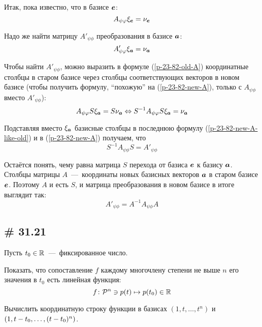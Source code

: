 \documentclass[a4paper,12pt]{article}
\begin{document}
\begin{solution}
    Итак, пока известно, что в базисе $\boldsymbol e$:
    \begin{equation}\label{p-23-82-old-A}
      A_{\psi \varphi} \xi_{\boldsymbol e} = \nu_{\boldsymbol e}
    \end{equation}
    
    Надо же найти матрицу $A'_{\psi\phi}$ преобразования в базисе $\boldsymbol a$:
    \begin{equation}\label{p-23-82-new-A}
      A'_{\psi\varphi} \xi_{\boldsymbol a} = \nu_{\boldsymbol a}
    \end{equation}
    
    Чтобы найти $A'_{\psi\phi}$, можно выразить в формуле (\ref{p-23-82-old-A}) координатные столбцы в старом базисе через столбцы соответствующих векторов в новом базисе (чтобы получить формулу, ``похожую'' на (\ref{p-23-82-new-A}), только с $A_{\psi\phi}$ вместо $A'_{\psi\phi}$):
    \begin{equation}\label{p-23-82-new-A-like-old}
      A_{\psi\varphi} S \xi_{\boldsymbol a} = S \nu_{\boldsymbol a}
      \Leftrightarrow S^{-1} A_{\psi\varphi} S \xi_{\boldsymbol a} = \nu_{\boldsymbol a}
    \end{equation}
    
    Подставляя вместо $\xi_{\boldsymbol a}$ базисные столбцы в последнюю формулу (\ref{p-23-82-new-A-like-old}) и в (\ref{p-23-82-new-A}) получаем, что
    \[
      S^{-1} A_{\psi\phi} S = A'_{\psi\phi}
    \]
    
    Остаётся понять, чему равна матрица $S$ перехода от базиса $\boldsymbol e$ к базису $\boldsymbol a$.
    Столбцы матрицы $A$~---~координаты новых базисных векторов $\boldsymbol a$ в старом базисе $\boldsymbol e$.
    Поэтому $A$ и есть $S$, и матрица преобразования в новом базисе в итоге выглядит так:
    \[
      A'_{\psi\phi} = A^{-1} A_{\psi\phi} A
    \]
  \end{solution}
  
  
  \subsection{\# 31.21}
  Пусть $t_0 \in \operatorname{\mathbb R}$~---~фиксированное число.
  
  Показать, что сопоставление $f$ каждому многочлену степени не выше $n$ его значения в $t_0$ есть линейная функция:
  \[
    f\colon \mathcal P^n \ni p(t) \mapsto p(t_0) \in \operatorname{\mathbb R}
  \]
  
  Вычислить координатную строку функции в базисах $(1, t, \ldots, t^n)$ и $(1, t \hm- t_0, \ldots, (t \hm- t_0)^n)$.
  
\end{document}
